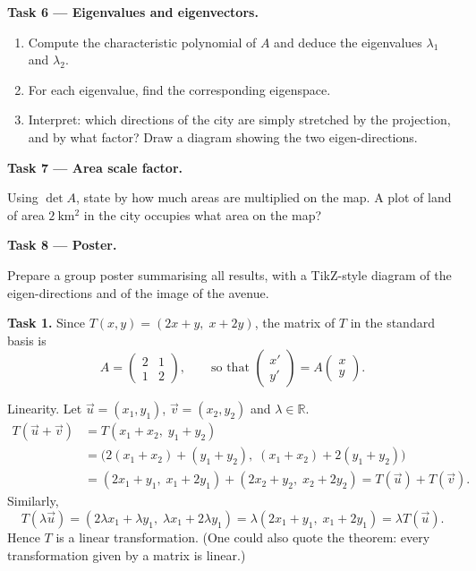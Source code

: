 \documentclass[11pt]{article}
\newcounter{popsec}
\newcounter{popsub}
\newcommand{\courssub}[1]{%
  \stepcounter{popsub}%
  \par\vspace{9pt}\noindent{\popxbold\fontsize{11.5}{13}\selectfont\color{popink}{\color{poporange}\thepopsec.\thepopsub}\hspace{6pt}#1}\par\nopagebreak\vspace{4pt}
}
\begin{document}
\textbf{Task 6 — Eigenvalues and eigenvectors.}
\begin{enumerate}
\item Compute the characteristic polynomial of $A$ and deduce the eigenvalues $\lambda_1$ and $\lambda_2$.
\item For each eigenvalue, find the corresponding eigenspace.
\item Interpret: which directions of the city are simply stretched by the projection, and by what factor? Draw a diagram showing the two eigen-directions.
\end{enumerate}

\textbf{Task 7 — Area scale factor.}

Using $\det A$, state by how much areas are multiplied on the map. A plot of land of area $2\ \mathrm{km^2}$ in the city occupies what area on the map?

\textbf{Task 8 — Poster.}

Prepare a group poster summarising all results, with a TikZ-style diagram of the eigen-directions and of the image of the avenue.

\courssub{Model answer}

\textbf{Task 1.} Since $T(x,y)=(2x+y,\;x+2y)$, the matrix of $T$ in the standard basis is
\[ A=\begin{pmatrix} 2 & 1 \\ 1 & 2 \end{pmatrix}, \qquad \text{so that } \begin{pmatrix} x' \\ y' \end{pmatrix} = A\begin{pmatrix} x \\ y \end{pmatrix}. \]

Linearity. Let $\vec{u}=(x_1,y_1)$, $\vec{v}=(x_2,y_2)$ and $\lambda\in\mathbb{R}$.
\begin{align*}
T(\vec{u}+\vec{v}) &= T(x_1+x_2,\;y_1+y_2)\\
&= \big(2(x_1+x_2)+(y_1+y_2),\;(x_1+x_2)+2(y_1+y_2)\big)\\
&= (2x_1+y_1,\;x_1+2y_1)+(2x_2+y_2,\;x_2+2y_2) = T(\vec{u})+T(\vec{v}).
\end{align*}
Similarly,
\[ T(\lambda\vec{u}) = (2\lambda x_1+\lambda y_1,\;\lambda x_1+2\lambda y_1) = \lambda(2x_1+y_1,\;x_1+2y_1)=\lambda T(\vec{u}). \]
Hence $T$ is a linear transformation. (One could also quote the theorem: every transformation given by a matrix is linear.)
\end{document}

